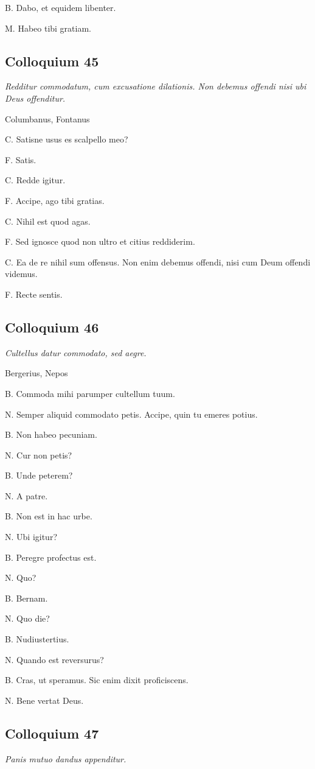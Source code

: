 \documentclass{article}
\begin{document}
B. Dabo, et equidem libenter.

M. Habeo tibi gratiam.

\subsection{Colloquium 45}
\emph{Redditur commodatum, cum excusatione dilationis. Non debemus offendi nisi ubi Deus offenditur.}

Columbanus, Fontanus

C. Satisne usus es scalpello meo?

F. Satis.

C. Redde igitur.

F. Accipe, ago tibi gratias.

C. Nihil est quod agas.

F. Sed ignosce quod non ultro et citius reddiderim.

C. Ea de re nihil sum offensus. Non enim debemus offendi, nisi cum Deum offendi videmus.

F. Recte sentis.

\subsection{Colloquium 46}
\emph{Cultellus datur commodato, sed aegre.}

Bergerius, Nepos

B. Commoda mihi parumper cultellum tuum.

N. Semper aliquid commodato petis. Accipe, quin tu emeres potius.

B. Non habeo pecuniam.

N. Cur non petis?

B. Unde peterem?

N. A patre.

B. Non est in hac urbe.

N. Ubi igitur?

B. Peregre profectus est.

N. Quo?

B. Bernam.

N. Quo die?

B. Nudiustertius.

N. Quando est reversurus?

B. Cras, ut speramus. Sic enim dixit proficiscens.

N. Bene vertat Deus.

\subsection{Colloquium 47}
\emph{Panis mutuo dandus appenditur.}
\end{document}
